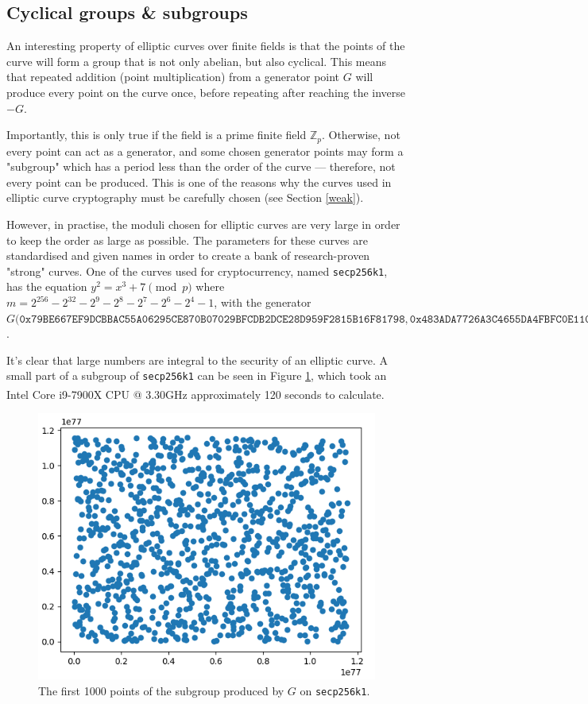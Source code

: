 \documentclass[a4paper]{article}
\begin{document}
\subsection{Cyclical groups \& subgroups}

An interesting property of elliptic curves over finite fields is that the points of the curve will form a group that is not only abelian, but also cyclical. This means that repeated addition (point multiplication) from a generator point $G$ will produce every point on the curve once, before repeating after reaching the inverse $-G$.

Importantly, this is only true if the field is a prime finite field $\mathbb{Z}_p$. Otherwise, not every point can act as a generator, and some chosen generator points may form a "subgroup" which has a period less than the order of the curve --- therefore, not every point can be produced.\cite{practical} This is one of the reasons why the curves used in elliptic curve cryptography must be carefully chosen (see Section \ref{weak}).

However, in practise, the moduli chosen for elliptic curves are very large in order to keep the order as large as possible. The parameters for these curves are standardised and given names in order to create a bank of research-proven "strong" curves. One of the curves used for cryptocurrency, named \texttt{secp256k1},\cite{sec} has the equation $y^2 = x^3 + 7 \pmod p$ where $m = 2^{256} - 2^{32} - 2^9 - 2^8 - 2^7 - 2^6 - 2^4 - 1$, with the generator $G(\texttt{0x79BE667EF9DCBBAC55A06295CE870B07029BFCDB2DCE28D959F2815B16F81798}, \texttt{0x483ADA7726A3C4655DA4FBFC0E1108A8FD17B448A68554199C47D08FFB10D4B8}$.

It's clear that large numbers are integral to the security of an elliptic curve. A small part of a subgroup of \texttt{secp256k1} can be seen in Figure \ref{fig:huge}, which took an Intel\textsuperscript{\tiny\textregistered} Core\textsuperscript{\tiny\texttrademark} i9-7900X CPU @ 3.30GHz approximately 120 seconds to calculate.

\begin{figure}
    \centering
    \includegraphics[width=0.5\linewidth]{images/big.png}
    \caption{The first 1000 points of the subgroup produced by $G$ on \texttt{secp256k1}.}
    \label{fig:huge}
\end{figure}
\end{document}
